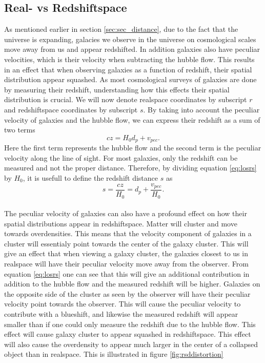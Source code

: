 \subsection{Real- vs Redshiftspace}
As mentioned earlier in section \ref{sec:sec_distance}, due to the fact that the
universe is expanding, galacies we observe in the universe on cosmological scales
move away from us and appear redshifted. In addition galaxies also have peculiar
velocities, which is their velocity when subtracting the hubble flow. This results in an effect that when observing galaxies
as a function of redshift, their spatial distribution appear squashed. As most
cosmological surveys of galaxies are done by measuring their redshift,
understanding how this effects their spatial distribution is crucial.
We will now denote realspace coordinates by subscript $r$ and redshiftspace
coordinates by subscript $s$. By taking into account the peculiar velocity of
galaxies and the hubble flow, we can express their redshift as a sum of two
terms
\begin{equation}\label{eq:losrs}
    cz=H_0d_p+v_{pec}.
\end{equation}
Here the first term represents the hubble flow and the second term is the
peculiar velocity along the line of sight. For most galaxies, only the redshift
can be measured and not the proper distance. Therefore, by dividing equation
\ref{eq:losrs} by $H_0$, it is usefull to define
the redshift distance $s$ as
\begin{equation}
    s = \frac{cz}{H_0}=d_p+\frac{v_{pec}}{H_0}.
\end{equation}
\\

The peculiar velocity of galaxies can also have a profound effect on how their
spatial distributions appear in redshiftspace. Matter will cluster and move
towards overdensities. This means that the velocity component of galaxies in a
cluster will essentialy point towards the center of the galaxy cluster. This
will give an effect that when viewing a galaxy cluster, the galaxies closest to
us in realspace will have their peculiar velocity move away from the observer.
From equation \ref{eq:losrs} one can see that this will give an additional
contribution in addition to the hubble flow and the measured redshift will be
higher. Galaxies on the opposite side of the cluster as seen by the observer
will have their peculiar velocity point towards the observer. This will cause
the peculiar velocity to contribute with a blueshift, and likewise the measured
redshift will appear smaller than if one could only measure the redshift due to
the hubble flow. This effect will cause galaxy cluster to appear squashed in
redshiftspace. This effect will also cause the overdensity to appear much larger
in the center of a collapsed object than in realspace. This is illustrated in
figure \ref{fig:rsddistortion}\\

